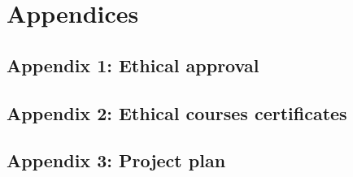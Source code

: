 \section{Appendices}
\label{sec:Appendices}

\subsection{Appendix 1: Ethical approval}

\newpage

\subsection{Appendix 2: Ethical courses certificates}

\newpage

\subsection{Appendix 3: Project plan}

